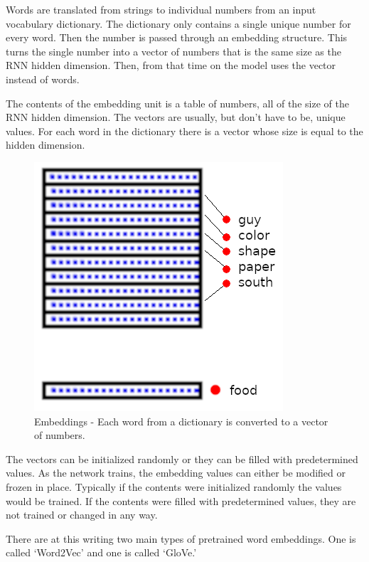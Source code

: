 Words are translated from strings to individual numbers from an input vocabulary dictionary. The dictionary only contains a single unique number for every word. Then the number is passed through an embedding structure. This turns the single number into a vector of numbers that is the same size as the RNN hidden dimension. Then, from that time on the model uses the vector instead of words.

The contents of the embedding unit is a table of numbers, all of the size of the RNN hidden dimension. The vectors are usually, but don\textquoteright t have to be, unique values. For each word in the dictionary there is a vector whose size is equal to the hidden dimension.

\begin{figure}[H]
	\begin{center}
		\includegraphics[scale=0.5]{diagram-embedding}
		
		
	\end{center}
	\caption[Word Embeddings]{Embeddings - Each word from a dictionary is converted to a vector of numbers.}
	

\end{figure}

The vectors can be initialized randomly or they can be filled with predetermined values. As the network trains, the embedding values can either be modified or frozen in place. Typically if the contents were initialized randomly the values would be trained. If the contents were filled with predetermined values, they are not trained or changed in any way. 

There are at this writing two main types of pretrained word embeddings. One is called \textquoteleft Word2Vec\textquoteright{} and one is called \textquoteleft GloVe.\textquoteright  

